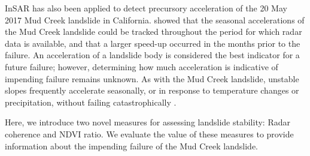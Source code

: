 \documentclass[journal abbreviation, manuscript]{copernicus}
\begin{document}
InSAR has also been applied to detect precursory acceleration of the 20 May 2017 Mud Creek landslide in California. \cite{Handwerger2019} showed that the seasonal accelerations of the Mud Creek landslide could be tracked throughout the period for which radar data is available, and that a larger speed-up occurred in the months prior to the failure. An acceleration of a landslide body is considered the best indicator for a future failure; however, determining how much acceleration is indicative of impending failure remains unknown. As with the Mud Creek landslide, unstable slopes frequently accelerate seasonally, or in response to temperature changes or precipitation, without failing catastrophically \citep{iverson2000, Segui2020, Handwerger2013}. \par Here, we introduce two novel measures for assessing landslide stability: Radar coherence and NDVI ratio. We evaluate the value of these  measures to provide information about the impending failure of the Mud Creek landslide.
\end{document}
